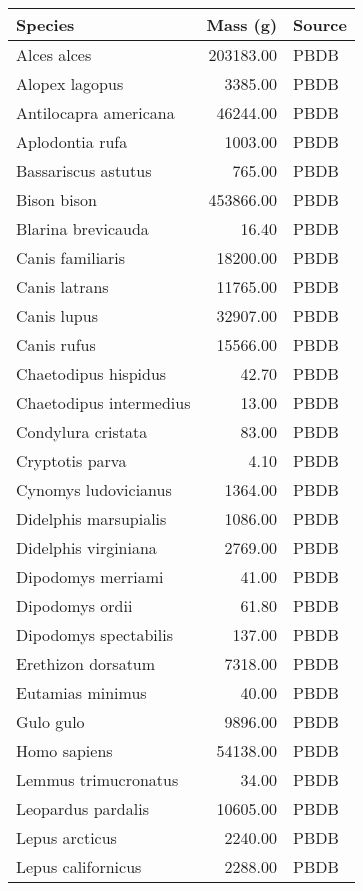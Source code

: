 \begin{table}[ht]
\centering
\begin{tabular}{lrl}
  \hline
Species & Mass (g) & Source \\ 
  \hline
Alces alces & 203183.00 & PBDB \\ 
  Alopex lagopus & 3385.00 & PBDB \\ 
  Antilocapra americana & 46244.00 & PBDB \\ 
  Aplodontia rufa & 1003.00 & PBDB \\ 
  Bassariscus astutus & 765.00 & PBDB \\ 
  Bison bison & 453866.00 & PBDB \\ 
  Blarina brevicauda & 16.40 & PBDB \\ 
  Canis familiaris & 18200.00 & PBDB \\ 
  Canis latrans & 11765.00 & PBDB \\ 
  Canis lupus & 32907.00 & PBDB \\ 
  Canis rufus & 15566.00 & PBDB \\ 
  Chaetodipus hispidus & 42.70 & PBDB \\ 
  Chaetodipus intermedius & 13.00 & PBDB \\ 
  Condylura cristata & 83.00 & PBDB \\ 
  Cryptotis parva & 4.10 & PBDB \\ 
  Cynomys ludovicianus & 1364.00 & PBDB \\ 
  Didelphis marsupialis & 1086.00 & PBDB \\ 
  Didelphis virginiana & 2769.00 & PBDB \\ 
  Dipodomys merriami & 41.00 & PBDB \\ 
  Dipodomys ordii & 61.80 & PBDB \\ 
  Dipodomys spectabilis & 137.00 & PBDB \\ 
  Erethizon dorsatum & 7318.00 & PBDB \\ 
  Eutamias minimus & 40.00 & PBDB \\ 
  Gulo gulo & 9896.00 & PBDB \\ 
  Homo sapiens & 54138.00 & PBDB \\ 
  Lemmus trimucronatus & 34.00 & PBDB \\ 
  Leopardus pardalis & 10605.00 & PBDB \\ 
  Lepus arcticus & 2240.00 & PBDB \\ 
  Lepus californicus & 2288.00 & PBDB \\ 

\end{tabular}
\end{table}
